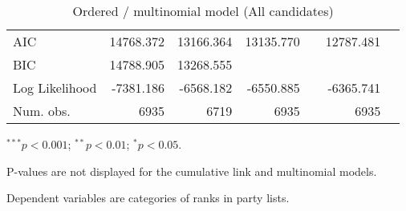 \begin{table}
\begin{center}
{\begin{threeparttable}
\begin{tabular}{l D{.}{.}{5.6} D{.}{.}{5.6} D{.}{.}{5.4} D{.}{.}{2.4} D{.}{.}{5.4} D{.}{.}{2.4}}
AIC                         & 14768.372              & 13166.364               & 13135.770               &                       & 12787.481               &                       \\
BIC                         & 14788.905              & 13268.555               &                         &                       &                         &                       \\
Log Likelihood              & -7381.186              & -6568.182               & -6550.885               &                       & -6365.741               &                       \\
Num. obs.                   & 6935                   & 6719                    & 6935                    &                       & 6935                    &                       \\
\bottomrule
\end{tabular}
\begin{tablenotes}[flushleft]
\scriptsize{
\item $^{***}p<0.001$; $^{**}p<0.01$; $^{*}p<0.05$.\item P-values are not displayed for the cumulative link and multinomial models.
\item Dependent variables are categories of ranks in party lists.}
\end{tablenotes}
\end{threeparttable}
}
\caption{Ordered / multinomial model (All candidates)}
\label{table:coefChoice}
\end{center}
\end{table}

